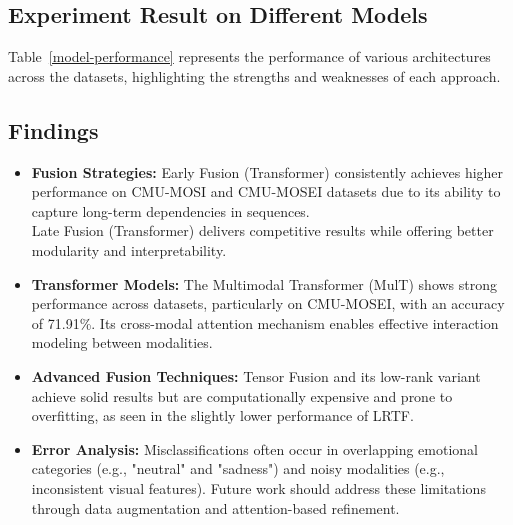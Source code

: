\documentclass{article}
\begin{document}
\subsection{Experiment Result on Different Models}

Table~\ref{model-performance} represents the performance of various architectures across the datasets, highlighting the strengths and weaknesses of each approach.

\subsection{Findings}

\begin{itemize}
    \item \textbf{Fusion Strategies:} Early Fusion (Transformer) consistently achieves higher performance on CMU-MOSI and CMU-MOSEI datasets due to its ability to capture long-term dependencies in sequences.\\
    Late Fusion (Transformer) delivers competitive results while offering better modularity and interpretability.\\

    \item \textbf{Transformer Models:} 
    The Multimodal Transformer (MulT) shows strong performance across datasets, particularly on CMU-MOSEI, with an accuracy of 71.91\%. Its cross-modal attention mechanism enables effective interaction modeling between modalities.\\
    
    \item \textbf{Advanced Fusion Techniques:} 
    Tensor Fusion and its low-rank variant achieve solid results but are computationally expensive and prone to overfitting, as seen in the slightly lower performance of LRTF.\\
    
    \item \textbf{Error Analysis:}
    Misclassifications often occur in overlapping emotional categories (e.g., "neutral" and "sadness") and noisy modalities (e.g., inconsistent visual features). Future work should address these limitations through data augmentation and attention-based refinement.
\end{itemize}
\end{document}
